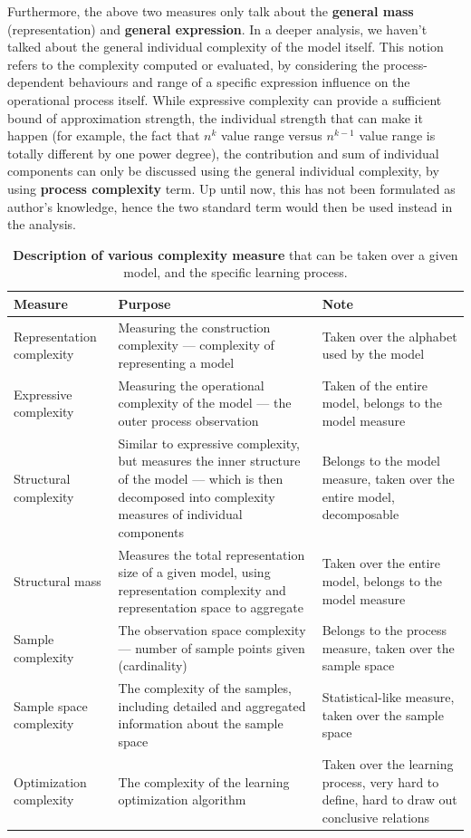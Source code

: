 \documentclass[10pt,oneside,oldfontcommands,dvipsnames,article]{memoir}
\begin{document}
Furthermore, the above two measures only talk about the \textbf{general mass} (representation) and \textbf{general expression}. In a deeper analysis, we haven't talked about the general individual complexity of the model itself. This notion refers to the complexity computed or evaluated, by considering the process-dependent behaviours and range of a specific expression influence on the operational process itself. While expressive complexity can provide a sufficient bound of approximation strength, the individual strength that can make it happen (for example, the fact that $n^{k}$ value range versus $n^{k-1}$ value range is totally different by one power degree), the contribution and sum of individual components can only be discussed using the general individual complexity, by using \textbf{process complexity} term. Up until now, this has not been formulated as author's knowledge, hence the two standard term would then be used instead in the analysis. 
\begin{table}[htbp]
    \centering
    \small
    \begin{tabular}{|p{3cm}|p{5cm}|p{5cm}|}
        \hline
        \textbf{Measure} & \textbf{Purpose} & \textbf{Note} \\
        \hline
        Representation complexity & Measuring the construction complexity — complexity of representing a model & Taken over the alphabet used by the model \\
        \hline
        Expressive complexity & Measuring the operational complexity of the model — the outer process observation & Taken of the entire model, belongs to the model measure \\
        \hline
        Structural complexity & Similar to expressive complexity, but measures the inner structure of the model — which is then decomposed into complexity measures of individual components & Belongs to the model measure, taken over the entire model, decomposable \\
        \hline
        Structural mass & Measures the total representation size of a given model, using representation complexity and representation space to aggregate & Taken over the entire model, belongs to the model measure \\
        \hline
        Sample complexity & The observation space complexity — number of sample points given (cardinality) & Belongs to the process measure, taken over the sample space \\
        \hline
        Sample space complexity & The complexity of the samples, including detailed and aggregated information about the sample space & Statistical-like measure, taken over the sample space \\
        \hline 
        Optimization complexity & The complexity of the learning optimization algorithm & Taken over the learning process, very hard to define, hard to draw out conclusive relations \\
        \hline
    \end{tabular}
    \caption{\textbf{Description of various complexity measure} that can be taken over a given model, and the specific learning process.}
\end{table}
\end{document}

